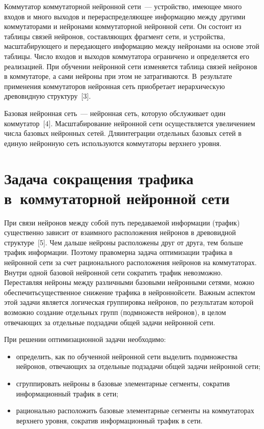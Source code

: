 \begin{multicols}{2}


     
     Коммутатор коммутаторной нейронной сети~--- устройство, имеющее 
много входов и много выходов и перераспределяющее информацию между
другими коммутаторами и нейронами коммутаторной нейронной сети. Он 
состоит из таблицы связей нейронов, составляющих фрагмент сети, и 
устройства, масштабирующего и передающего информацию между 
нейронами на основе этой таблицы. Число входов и выходов коммутатора 
ограничено и определяется его реализацией. При обучении нейронной сети 
изменяется таблица связей нейронов в коммутаторе, а сами нейроны при 
этом не  затрагиваются. В~результате применения коммутаторов  нейронная 
сеть приобретает иерархическую древовидную структуру~[3].
     
     Базовая нейронная сеть~--- нейронная сеть, которую обслуживает один 
коммутатор~[4]. Мас\-шта\-бирование нейронной сети осуществляется 
увеличением числа базовых нейронных сетей. Для\linebreak интеграции отдельных 
базовых сетей в единую нейронную сеть используются коммутаторы 
верхнего уровня.

\section{Задача сокращения трафика в~коммутаторной 
нейронной сети}
\vspace*{-12pt}

     При связи нейронов между собой путь передаваемой информации 
(трафик) существенно зависит от взаимного расположения нейронов в 
древовидной структуре~[5]. Чем дальше нейроны расположены друг от 
друга, тем больше трафик информации. Поэтому правомерна задача 
оптимизации трафика в нейронной сети за счет рационального расположения 
нейронов на коммутаторах. Внутри одной базовой нейронной сети сократить 
трафик невозможно. Переставляя нейроны между различными базовыми 
нейронными сетями, можно обеспечить\linebreak существенное снижение трафика в 
нейронной\linebreak сети. Важным аспектом этой задачи является логическая 
группировка нейронов, по результатам которой возможно создание 
отдельных групп (подмножеств нейронов), в целом отвечающих за 
отдельные подзадачи общей задачи нейронной сети.
\pagebreak
     
     При решении оптимизационной задачи необходимо:
     \begin{itemize}
     \item определить, как по обученной нейронной сети выделить 
подмножества нейронов, отвечающих за отдельные подзадачи общей задачи 
нейронной сети;
     \item сгруппировать нейроны в базовые элементарные сегменты, 
сократив информационный трафик в сети;
     \item рационально расположить базовые элементарные сегменты на 
коммутаторах верхнего уровня, сократив информационный трафик в сети.
     \end{itemize}
     

\end{multicols}
